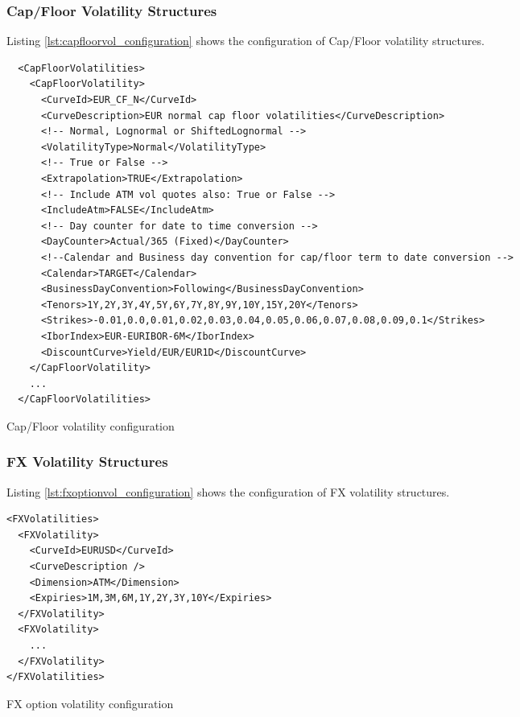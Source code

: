 \documentclass[12pt, a4paper]{article}
\newenvironment{longlisting}{\captionsetup{type=listing}}{}
\begin{document}
\subsubsection{Cap/Floor Volatility Structures}

Listing \ref{lst:capfloorvol_configuration} shows the configuration of Cap/Floor volatility structures.

\begin{longlisting}
\begin{verbatim}
  <CapFloorVolatilities>
    <CapFloorVolatility>
      <CurveId>EUR_CF_N</CurveId>
      <CurveDescription>EUR normal cap floor volatilities</CurveDescription>
      <!-- Normal, Lognormal or ShiftedLognormal -->
      <VolatilityType>Normal</VolatilityType>
      <!-- True or False -->
      <Extrapolation>TRUE</Extrapolation>
      <!-- Include ATM vol quotes also: True or False -->
      <IncludeAtm>FALSE</IncludeAtm>
      <!-- Day counter for date to time conversion -->
      <DayCounter>Actual/365 (Fixed)</DayCounter>
      <!--Calendar and Business day convention for cap/floor term to date conversion -->
      <Calendar>TARGET</Calendar>
      <BusinessDayConvention>Following</BusinessDayConvention>
      <Tenors>1Y,2Y,3Y,4Y,5Y,6Y,7Y,8Y,9Y,10Y,15Y,20Y</Tenors>
      <Strikes>-0.01,0.0,0.01,0.02,0.03,0.04,0.05,0.06,0.07,0.08,0.09,0.1</Strikes>
      <IborIndex>EUR-EURIBOR-6M</IborIndex>
      <DiscountCurve>Yield/EUR/EUR1D</DiscountCurve>
    </CapFloorVolatility>
    ...
  </CapFloorVolatilities>
\end{verbatim}
\caption{Cap/Floor volatility configuration}
\label{lst:capfloorvol_configuration}
\end{longlisting}

\subsubsection{FX Volatility Structures}

Listing \ref{lst:fxoptionvol_configuration} shows the configuration of FX volatility structures.

\begin{longlisting}
\begin{verbatim}
<FXVolatilities>
  <FXVolatility>
    <CurveId>EURUSD</CurveId>
    <CurveDescription />
    <Dimension>ATM</Dimension>
    <Expiries>1M,3M,6M,1Y,2Y,3Y,10Y</Expiries>
  </FXVolatility>
  <FXVolatility>
    ...
  </FXVolatility>
</FXVolatilities>
\end{verbatim}
\caption{FX option volatility configuration}
\label{lst:fxoptionvol_configuration}
\end{longlisting}
\end{document}
